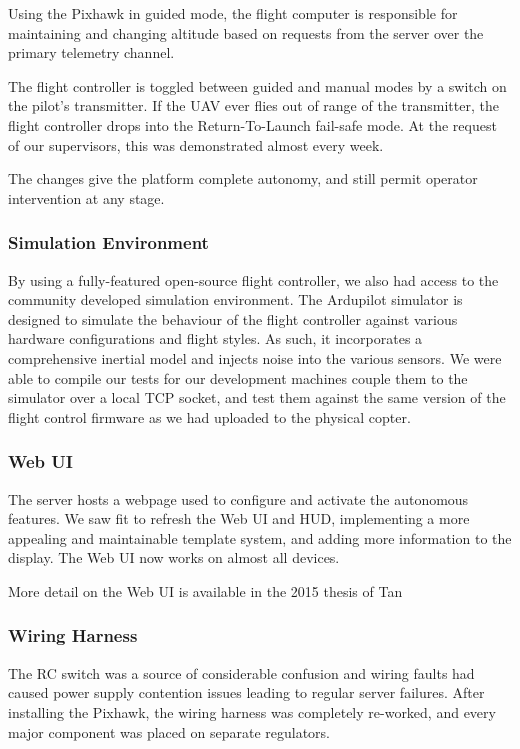 \documentclass{article}
\begin{document}
      Using the Pixhawk in guided mode, the flight computer is responsible for maintaining and changing altitude based on requests from the server over the primary telemetry channel.
      
      The flight controller is toggled between guided and manual modes by a switch on the pilot's transmitter.  If the UAV ever flies out of range of the transmitter, the flight controller drops into the Return-To-Launch fail-safe mode.  At the request of our supervisors, this was demonstrated almost every week.

      The changes give the platform complete autonomy, and still permit operator intervention at any stage.

    \subsubsection{Simulation Environment}
      By using a fully-featured open-source flight controller, we also had access to the community developed simulation environment.  
      The Ardupilot simulator is designed to simulate the behaviour of the flight controller against various hardware configurations and flight styles.  As such, it incorporates a comprehensive inertial model and injects noise into the various sensors.
      We were able to compile our tests for our development machines couple them to the simulator over a local TCP socket, and test them against the same version of the flight control firmware as we had uploaded to the physical copter.

    \subsubsection{Web UI}
      The server hosts a webpage used to configure and activate the autonomous features.
      We saw fit to refresh the Web UI and HUD, implementing a more appealing and maintainable template system, and adding more information to the display.
      The Web UI now works on almost all devices.

      More detail on the Web UI is available in the 2015 thesis of Tan \cite{Tan}

    \subsubsection{Wiring Harness}
      The RC switch was a source of considerable confusion and wiring faults had caused power supply contention issues leading to regular server failures.
      After installing the Pixhawk, the wiring harness was completely re-worked, and every major component was placed on separate regulators.
\end{document}
